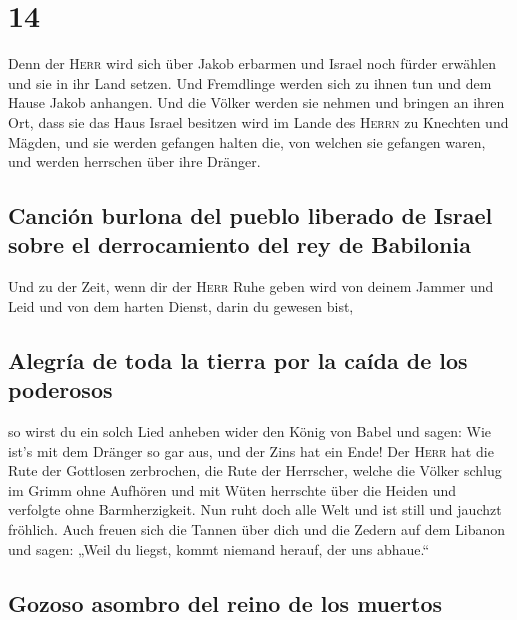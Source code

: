 \hypertarget{section-13}{%
\section{14}\label{section-13}}

 Denn der \textsc{Herr} wird sich über Jakob erbarmen und
Israel noch fürder erwählen und sie in ihr Land setzen. Und Fremdlinge
werden sich zu ihnen tun und dem Hause Jakob anhangen. 
Und die Völker werden sie nehmen und bringen an ihren Ort, dass sie das
Haus Israel besitzen wird im Lande des \textsc{Herrn} zu Knechten und
Mägden, und sie werden gefangen halten die, von welchen sie gefangen
waren, und werden herrschen über ihre Dränger.

\hypertarget{canciuxf3n-burlona-del-pueblo-liberado-de-israel-sobre-el-derrocamiento-del-rey-de-babilonia}{%
\subsection{Canción burlona del pueblo liberado de Israel sobre el
derrocamiento del rey de
Babilonia}\label{canciuxf3n-burlona-del-pueblo-liberado-de-israel-sobre-el-derrocamiento-del-rey-de-babilonia}}

 Und zu der Zeit, wenn dir der \textsc{Herr} Ruhe geben
wird von deinem Jammer und Leid und von dem harten Dienst, darin du
gewesen bist,

\hypertarget{alegruxeda-de-toda-la-tierra-por-la-cauxedda-de-los-poderosos}{%
\subsection{Alegría de toda la tierra por la caída de los
poderosos}\label{alegruxeda-de-toda-la-tierra-por-la-cauxedda-de-los-poderosos}}

 so wirst du ein solch Lied anheben wider den König von
Babel und sagen: Wie ist's mit dem Dränger so gar aus, und der Zins hat
ein Ende!  Der \textsc{Herr} hat die Rute der Gottlosen
zerbrochen, die Rute der Herrscher,  welche die Völker
schlug im Grimm ohne Aufhören und mit Wüten herrschte über die Heiden
und verfolgte ohne Barmherzigkeit.  Nun ruht doch alle
Welt und ist still und jauchzt fröhlich.  Auch freuen sich
die Tannen über dich und die Zedern auf dem Libanon und sagen: „Weil du
liegst, kommt niemand herauf, der uns abhaue.``

\hypertarget{gozoso-asombro-del-reino-de-los-muertos}{%
\subsection{Gozoso asombro del reino de los
muertos}\label{gozoso-asombro-del-reino-de-los-muertos}}

